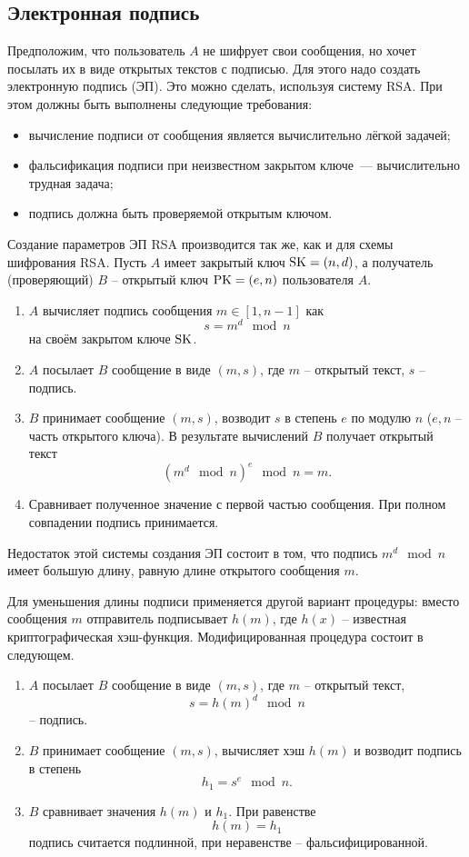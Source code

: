 \subsection{Электронная подпись}

Предположим, что пользователь $A$ не шифрует свои сообщения, но хочет посылать их в виде открытых текстов с подписью. Для этого надо создать электронную подпись (ЭП). Это можно сделать, используя систему RSA. При этом должны быть выполнены следующие требования:
\begin{itemize}
    \item вычисление подписи от сообщения является вычислительно лёгкой задачей;
    \item фальсификация подписи при неизвестном закрытом ключе~--- вычислительно трудная задача;
    \item подпись должна быть проверяемой открытым ключом.
\end{itemize}

Создание параметров ЭП RSA производится так же, как и для схемы шифрования RSA. Пусть $A$ имеет закрытый ключ $\textrm{SK} = (n, d)$, а получатель (проверяющий) $B$ -- открытый ключ $\textrm{PK} = (e,n)$ пользователя $A$.

\begin{enumerate}
    \item $A$ вычисляет подпись сообщения $m \in [1,n-1]$ как
        \[ s = m^{d} \mod n \]
        на своём закрытом ключе $\textrm{SK}$.
    \item $A$ посылает $B$ сообщение в виде $(m, s)$, где $m$ -- открытый текст, $s$ -- подпись.
    \item $B$ принимает сообщение $(m, s)$, возводит $s$ в степень $e$ по модулю $n$ ($e, n$ -- часть открытого ключа). В результате вычислений $B$ получает открытый текст
        \[ \left( m^{d} \mod n \right)^{e} \mod n = m. \]
    \item Сравнивает полученное значение с первой частью сообщения. При полном совпадении подпись принимается.
\end{enumerate}
Недостаток этой системы создания ЭП состоит в том, что подпись $m^{d} \mod n$ имеет большую длину, равную длине открытого сообщения $m$.

Для уменьшения длины подписи применяется другой вариант процедуры: вместо сообщения $m$ отправитель подписывает $h(m)$, где $h(x)$ -- известная криптографическая хэш-функция. Модифицированная процедура состоит в следующем.

\begin{enumerate}
    \item $A$ посылает $B$ сообщение в виде $(m, s)$, где $m$ -- открытый текст,
        \[ s = h(m)^d \mod n \]
        -- подпись.
    \item $B$ принимает сообщение $(m, s)$, вычисляет хэш $h(m)$ и возводит подпись в степень
        \[ h_1 = s^e \mod n. \]
    \item $B$ сравнивает значения $h(m)$ и $h_1$. При равенстве
        \[ h(m) = h_1 \]
        подпись считается подлинной, при неравенстве -- фальсифицированной.
\end{enumerate}


